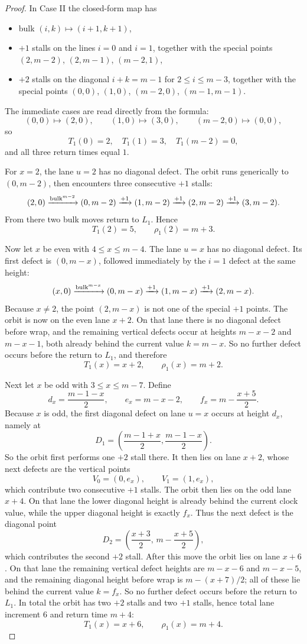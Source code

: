 \begin{proof}
In Case II the closed-form map has
\begin{itemize}[leftmargin=2em]
\item bulk $(i,k)\mapsto(i+1,k+1)$,
\item $+1$ stalls on the lines $i=0$ and $i=1$, together with the special points
$(2,m-2)$, $(2,m-1)$, $(m-2,1)$,
\item $+2$ stalls on the diagonal $i+k=m-1$ for $2\le i\le m-3$, together with the special points
$(0,0)$, $(1,0)$, $(m-2,0)$, $(m-1,m-1)$.
\end{itemize}

The immediate cases are read directly from the formula:
\[
(0,0)\mapsto(2,0),\qquad (1,0)\mapsto(3,0),\qquad (m-2,0)\mapsto(0,0),
\]
so
\[
T_1(0)=2,\quad T_1(1)=3,\quad T_1(m-2)=0,
\]
and all three return times equal $1$.

For $x=2$, the lane $u=2$ has no diagonal defect.
The orbit runs generically to $(0,m-2)$, then encounters three consecutive $+1$ stalls:
\[
(2,0)\xrightarrow{\mathrm{bulk}^{m-2}}(0,m-2)\xrightarrow{+1}(1,m-2)\xrightarrow{+1}(2,m-2)\xrightarrow{+1}(3,m-2).
\]
From there two bulk moves return to $L_1$.
Hence
\[
T_1(2)=5,\qquad \rho_1(2)=m+3.
\]

Now let $x$ be even with $4\le x\le m-4$.
The lane $u=x$ has no diagonal defect.
Its first defect is $(0,m-x)$, followed immediately by the $i=1$ defect at the same height:
\[
(x,0)\xrightarrow{\mathrm{bulk}^{m-x}}(0,m-x)\xrightarrow{+1}(1,m-x)\xrightarrow{+1}(2,m-x).
\]
Because $x\neq 2$, the point $(2,m-x)$ is not one of the special $+1$ points.
The orbit is now on the even lane $x+2$.
On that lane there is no diagonal defect before wrap, and the remaining vertical defects occur at heights
$m-x-2$ and $m-x-1$, both already behind the current value $k=m-x$.
So no further defect occurs before the return to $L_1$, and therefore
\[
T_1(x)=x+2,\qquad \rho_1(x)=m+2.
\]

Next let $x$ be odd with $3\le x\le m-7$.
Define
\[
d_x=\frac{m-1-x}{2},\qquad e_x=m-x-2,\qquad f_x=m-\frac{x+5}{2}.
\]
Because $x$ is odd, the first diagonal defect on lane $u=x$ occurs at height $d_x$, namely at
\[
D_1=\left(\frac{m-1+x}{2},\frac{m-1-x}{2}\right).
\]
So the orbit first performs one $+2$ stall there.
It then lies on lane $x+2$, whose next defects are the vertical points
\[
V_0=(0,e_x),\qquad V_1=(1,e_x),
\]
which contribute two consecutive $+1$ stalls.
The orbit then lies on the odd lane $x+4$.
On that lane the lower diagonal height is already behind the current clock value, while the upper diagonal
height is exactly $f_x$.
Thus the next defect is the diagonal point
\[
D_2=\left(\frac{x+3}{2},\,m-\frac{x+5}{2}\right),
\]
which contributes the second $+2$ stall.
After this move the orbit lies on lane $x+6$.
On that lane the remaining vertical defect heights are $m-x-6$ and $m-x-5$, and the remaining diagonal
height before wrap is $m-(x+7)/2$; all of these lie behind the current value $k=f_x$.
So no further defect occurs before the return to $L_1$.
In total the orbit has two $+2$ stalls and two $+1$ stalls, hence total lane increment $6$ and return time
$m+4$:
\[
T_1(x)=x+6,\qquad \rho_1(x)=m+4.
\]


\end{proof}
